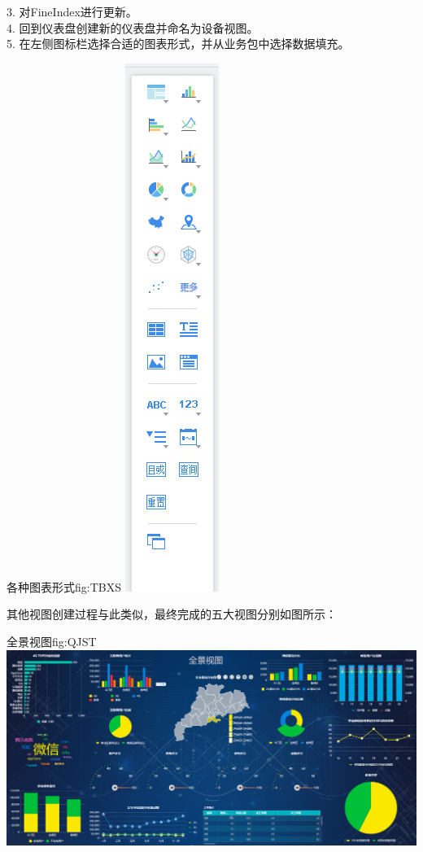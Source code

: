 \documentclass{HustGraduPaper}
\begin{document}
    3. 对FineIndex进行更新。\\
    4. 回到仪表盘创建新的仪表盘并命名为设备视图。\\
    5. 在左侧图标栏选择合适的图表形式，并从业务包中选择数据填充。\\
    \begin{generalfig}{各种图表形式}{fig:TBXS} 
        \includegraphics[scale = 0.5]{Figures/TBXS.png} 
    \end{generalfig}

    其他视图创建过程与此类似，最终完成的五大视图分别如图所示：

    \begin{generalfig}{全景视图}{fig:QJST} 
        \includegraphics[width = \textwidth]{Figures/QJST.png} 
    \end{generalfig}
\end{document}
